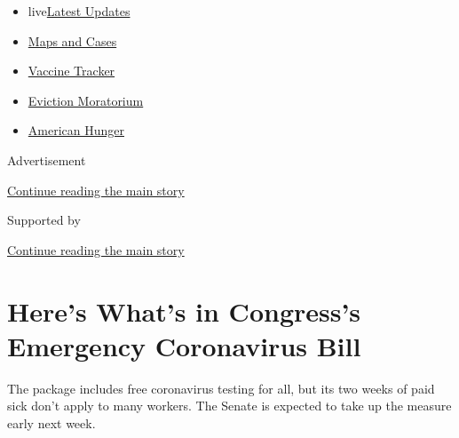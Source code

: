 \begin{itemize}
\tightlist
\item
  live\href{https://www.nytimes3xbfgragh.onion/2020/09/08/world/covid-19-coronavirus.html?name=styln-coronavirus-national\&region=TOP_BANNER\&block=storyline_menu_recirc\&action=click\&pgtype=Article\&impression_id=435b4bd0-f27a-11ea-9b1f-ab8611e6ed59\&variant=undefined}{Latest
  Updates}
\item
  \href{https://www.nytimes3xbfgragh.onion/interactive/2020/us/coronavirus-us-cases.html?name=styln-coronavirus-national\&region=TOP_BANNER\&block=storyline_menu_recirc\&action=click\&pgtype=Article\&impression_id=435b4bd1-f27a-11ea-9b1f-ab8611e6ed59\&variant=undefined}{Maps
  and Cases}
\item
  \href{https://www.nytimes3xbfgragh.onion/interactive/2020/science/coronavirus-vaccine-tracker.html?name=styln-coronavirus-national\&region=TOP_BANNER\&block=storyline_menu_recirc\&action=click\&pgtype=Article\&impression_id=435b4bd2-f27a-11ea-9b1f-ab8611e6ed59\&variant=undefined}{Vaccine
  Tracker}
\item
  \href{https://www.nytimes3xbfgragh.onion/2020/09/02/your-money/eviction-moratorium-covid.html?name=styln-coronavirus-national\&region=TOP_BANNER\&block=storyline_menu_recirc\&action=click\&pgtype=Article\&impression_id=435b4bd3-f27a-11ea-9b1f-ab8611e6ed59\&variant=undefined}{Eviction
  Moratorium}
\item
  \href{https://www.nytimes3xbfgragh.onion/interactive/2020/09/02/magazine/food-insecurity-hunger-us.html?name=styln-coronavirus-national\&region=TOP_BANNER\&block=storyline_menu_recirc\&action=click\&pgtype=Article\&impression_id=435b4bd4-f27a-11ea-9b1f-ab8611e6ed59\&variant=undefined}{American
  Hunger}
\end{itemize}

Advertisement

\protect\hyperlink{after-top}{Continue reading the main story}

Supported by

\protect\hyperlink{after-sponsor}{Continue reading the main story}

\hypertarget{heres-whats-in-congresss-emergency-coronavirus-bill}{%
\section{Here's What's in Congress's Emergency Coronavirus
Bill}\label{heres-whats-in-congresss-emergency-coronavirus-bill}}

The package includes free coronavirus testing for all, but its two weeks
of paid sick don't apply to many workers. The Senate is expected to take
up the measure early next week.

